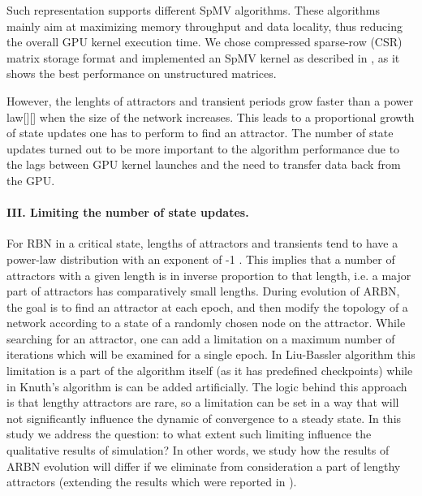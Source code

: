 \documentclass[procedia]{easychair}
\begin{document}
	 Such representation supports different SpMV algorithms. These algorithms mainly aim at maximizing memory throughput and data locality, thus reducing the overall GPU kernel execution time. We chose compressed sparse-row (CSR) matrix storage format and implemented an SpMV kernel as described in \cite{bell2008efficient}, as it shows the best performance on unstructured matrices.
	
	However, the lenghts of attractors and transient periods grow faster than a power law[][] when the size of the network increases. This leads to a proportional growth of state updates one has to perform to find an attractor. The number of state updates turned out to be more important to the algorithm performance due to the lags between GPU kernel launches and the need to transfer data back from the GPU. 
	
	\paragraph{III. Limiting the number of state updates.} For RBN in a critical state, lengths of attractors and transients tend to have a power-law distribution with an exponent of -1 \cite{greil2009attractor}. This implies that a number of attractors with a given length is in inverse proportion to that length, i.e. a major part of attractors has comparatively small lengths. During evolution of ARBN, the goal is to find an attractor at each epoch, and then modify the topology of a network according to a state of a randomly chosen node on the attractor. While searching for an attractor, one can add a limitation on a maximum number of iterations which will be examined for a single epoch. In Liu-Bassler algorithm this limitation is a part of the algorithm itself (as it has predefined checkpoints) while in Knuth's algorithm is can be added artificially. The logic behind this approach is that lengthy attractors are rare, so a limitation can be set in a way that will not significantly influence the dynamic of convergence to a steady state. In this study we address the question: to what extent such limiting influence the qualitative results of simulation? In other words, we study how the results of ARBN evolution will differ if we eliminate from consideration a part of lengthy attractors (extending the results which were reported in \cite{Gorski2016}).
\end{document}

